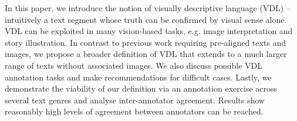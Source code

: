 In this paper, we introduce the notion of visually descriptive language (VDL) -- intuitively a text segment whose truth can be confirmed by visual sense alone. VDL can be exploited in many vision-based tasks, e.g. image interpretation and story illustration. In contrast to previous work requiring pre-aligned texts and images, we propose a broader definition of VDL that extends to a much larger range of texts without associated images. We also discuss possible VDL annotation tasks and make recommendations for difficult cases. Lastly, we demonstrate the viability of our definition via an annotation exercise across several text genres and analyse inter-annotator agreement. Results show reasonably high levels of agreement between annotators can be reached.
